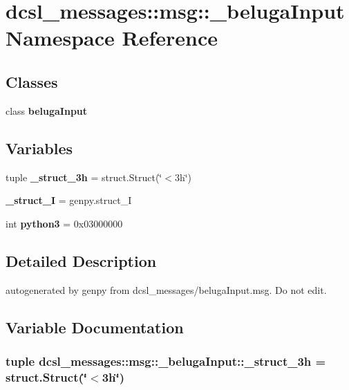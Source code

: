\section{dcsl\-\_\-messages\-:\-:msg\-:\-:\-\_\-beluga\-Input \-Namespace \-Reference}
\label{namespacedcsl__messages_1_1msg_1_1__belugaInput}
\subsection*{\-Classes}
\begin{DoxyCompactItemize}
\item 
class {\bf beluga\-Input}
\end{DoxyCompactItemize}
\subsection*{\-Variables}
\begin{DoxyCompactItemize}
\item 
tuple {\bf \-\_\-struct\-\_\-3h} = struct.\-Struct(\char`\"{}$<$3h\char`\"{})
\item 
{\bf \-\_\-struct\-\_\-\-I} = genpy.\-struct\-\_\-\-I
\item 
int {\bf python3} = 0x03000000
\end{DoxyCompactItemize}


\subsection{\-Detailed \-Description}
\begin{DoxyVerb}autogenerated by genpy from dcsl_messages/belugaInput.msg. Do not edit.\end{DoxyVerb}
 

\subsection{\-Variable \-Documentation}
\subsubsection[{\-\_\-struct\-\_\-3h}]{\setlength{\rightskip}{0pt plus 5cm}tuple {\bf dcsl\-\_\-messages\-::msg\-::\-\_\-beluga\-Input\-::\-\_\-struct\-\_\-3h} = struct.\-Struct(\char`\"{}$<$3h\char`\"{})}\label{namespacedcsl__messages_1_1msg_1_1__belugaInput_a608573c0c8e4d16587d0e322fbcc126b}


